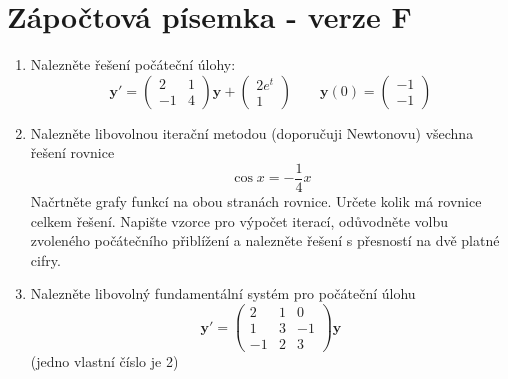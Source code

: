 \documentclass[a4paper,10pt]{article}
\def\vc#1{\mathbf{\boldsymbol{#1}}}     %
\begin{document}
\section*{Zápočtová písemka - verze F}
\begin{enumerate}
 \item 
   Nalezněte řešení počáteční úlohy:
   \[
    \vc y'=\begin{pmatrix}
          2 & 1 \\ -1 & 4
       \end{pmatrix} \vc y
       +
       \begin{pmatrix}
         2 e^t \\  1
       \end{pmatrix}
    \qquad
    \vc y(0)=\begin{pmatrix}
           -1 \\ -1
         \end{pmatrix}
   \]
 \item 
    Nalezněte libovolnou iterační metodou (doporučuji Newtonovu) všechna řešení rovnice
    \[
       \cos x=-\frac14 x
    \]
    Načrtněte grafy funkcí na obou stranách rovnice. Určete kolik má rovnice celkem řešení.
    Napište vzorce pro výpočet iterací, odůvodněte volbu zvoleného počátečního přiblížení
    a nalezněte řešení s přesností na dvě platné cifry.
 \item
    Nalezněte libovolný fundamentální systém pro počáteční úlohu
    \[
    \vc y'=\begin{pmatrix}
          2 & 1 & 0 \\ 
          1 & 3 & -1 \\
          -1 & 2 & 3
       \end{pmatrix} \vc y   
    \]
   (jedno vlastní číslo je 2)
\end{enumerate}
\end{document}
